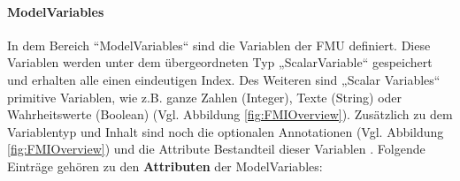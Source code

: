 \paragraph{ModelVariables}\label{sec:ModelVariables}
\noindent In dem Bereich “ModelVariables“ sind die Variablen der FMU definiert. Diese Variablen werden unter dem übergeordneten Typ „ScalarVariable“ gespeichert und erhalten alle einen eindeutigen Index. Des Weiteren sind „Scalar Variables“ primitive Variablen, wie z.B. ganze Zahlen (Integer), Texte (String) oder Wahrheitswerte (Boolean) (Vgl. Abbildung \ref{fig:FMIOverview}). Zusätzlich zu dem Variablentyp und Inhalt sind noch die optionalen Annotationen (Vgl. Abbildung \ref{fig:FMIOverview}) und die Attribute Bestandteil dieser Variablen \cite[S.45]{25}. 
\newline
Folgende Einträge gehören zu den \textbf{Attributen} der ModelVariables:
